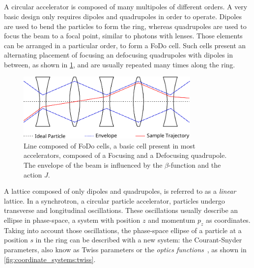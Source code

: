 \subsection{}

\subsubsection{}
\label{section:courant_snyder}

A circular accelerator is composed of many multipoles of different orders. A very basic
design only requires dipoles and quadrupoles in order to operate. Dipoles are used to bend the
particles to form the ring, whereas quadrupoles are used to focus the beam to a focal
point, similar to photons with lenses.
Those elements can be arranged in a particular order, to form a FoDo cell. Such cells present an
alternating placement of focusing an defocusing quadrupoles with dipoles in between, as shown in
\cref{fig:coordinate_systems:fodo}, and are usually repeated many times along the ring.

\begin{figure}[htb]
    \centering
    \includegraphics[width=0.8\textwidth]{images/fodo_drawing.pdf}
    \caption{Line composed of FoDo cells, a basic cell present in most accelerators, composed of a
    Focusing and a Defocusing quadrupole. The envelope of the beam is influenced by the
    $\beta$-function and the action $J$.}
    \label{fig:coordinate_systems:fodo}
\end{figure}

A lattice composed of only dipoles and quadrupoles, is referred to as a \textit{linear} lattice. In
a synchrotron, a circular particle accelerator, particles undergo transverse and longitudinal 
oscillations. 
These oscillations usually describe an ellipse in phase-space, a system with position $z$ and
momentum $p_z$ as coordinates.
Taking into account those oscillations, the phase-space ellipse of a particle at a position $s$ in
the ring can be described with a new system: the Courant-Snyder parameters, also know as Twiss
parameters or the \textit{optics functions}~\cite{courant_theory_1958}, as shown in
\cref{fig:coordinate_systems:twiss}.

